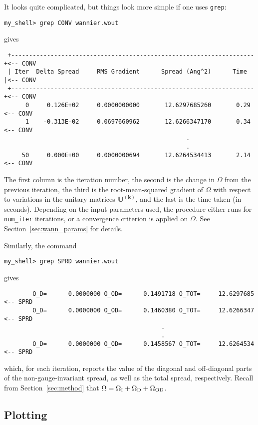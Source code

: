 It looks quite complicated, but things look more simple if one uses
{\tt grep}:

{\tt my\_shell> grep CONV wannier.wout}

gives

\begin{verbatim}
 +--------------------------------------------------------------------+<-- CONV
 | Iter  Delta Spread     RMS Gradient      Spread (Ang^2)      Time  |<-- CONV
 +--------------------------------------------------------------------+<-- CONV
      0     0.126E+02     0.0000000000       12.6297685260       0.29  <-- CONV
      1    -0.313E-02     0.0697660962       12.6266347170       0.34  <-- CONV
                                                   .
                                                   .
     50     0.000E+00     0.0000000694       12.6264534413       2.14  <-- CONV
\end{verbatim}

The first column is the iteration number, the second is the change in
$\Omega$ from the previous iteration, the third is the root-mean-squared
gradient of $\Omega$ with respect to variations in the unitary
matrices $\mathbf{U}^{(\mathbf{k})}$, and the last is the time taken (in
seconds). Depending on the input parameters used, the procedure either
runs for {\tt num\_iter} iterations, or a convergence criterion is
applied on $\Omega$. See Section~\ref{sec:wann_params} for details.

Similarly, the command

{\tt my\_shell> grep SPRD wannier.wout}

gives

\begin{verbatim}
        O_D=      0.0000000 O_OD=      0.1491718 O_TOT=     12.6297685 <-- SPRD
        O_D=      0.0000000 O_OD=      0.1460380 O_TOT=     12.6266347 <-- SPRD
                                            .
                                            .
        O_D=      0.0000000 O_OD=      0.1458567 O_TOT=     12.6264534 <-- SPRD         
\end{verbatim}

which, for each iteration, reports the value of the diagonal and
off-diagonal parts of the non-gauge-invariant spread, as well as the
total spread, respectively. Recall from Section~\ref{sec:method} that
$\Omega = \Omega_{\mathrm{I}} + \Omega_{\mathrm{D}} + \Omega_{\mathrm{OD}}$. 

\subsection{Plotting}

